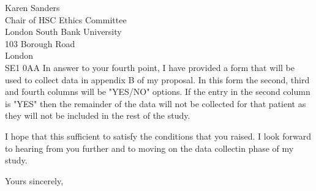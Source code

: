\documentclass
[
	12pt,
	a4paper,
	oneside
]{letter}
\begin{document}
\begin{letter}{Karen Sanders\\
		Chair of HSC Ethics Committee\\
		London South Bank University\\
		103 Borough Road\\
		London\\
		SE1 0AA}
In answer to your fourth point, I have provided a form that will be used to 
collect data in appendix B of my proposal. In this form the second, third and 
fourth columns will be "YES/NO" options. If the entry in the second column is 
"YES" then the remainder of the data will not be collected for that patient as 
they will not be included in the rest of the study.

I hope that this sufficient to satisfy the conditions that you raised. I look
forward to hearing from you further and to moving on the data collectin phase 
of my study.

\closing{Yours sincerely,}


\end{letter}
\end{document}
